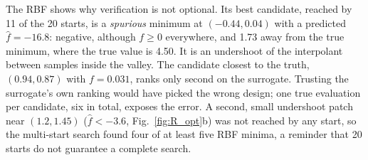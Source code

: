 The RBF shows why verification is not optional. Its best candidate, reached by 11 of the 20 starts, is a \emph{spurious} minimum at $(-0.44,0.04)$ with a predicted $\hat f=-16.8$: negative, although $f\ge0$ everywhere, and 1.73 away from the true minimum, where the true value is 4.50. It is an undershoot of the interpolant between samples inside the valley. The candidate closest to the truth, $(0.94,0.87)$ with $f=0.031$, ranks only second on the surrogate. Trusting the surrogate's own ranking would have picked the wrong design; one true evaluation per candidate, six in total, exposes the error. A second, small undershoot patch near $(1.2,1.45)$ ($\hat f<-3.6$, Fig.~\ref{fig:R_opt}b) was not reached by any start, so the multi-start search found four of at least five RBF minima, a reminder that 20 starts do not guarantee a complete search.

